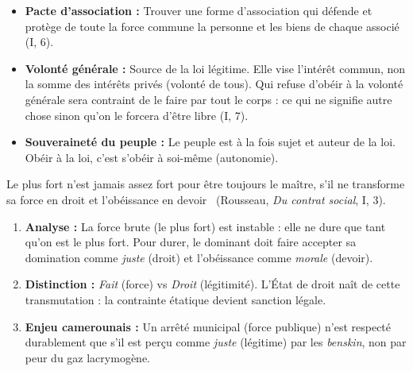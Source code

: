 \documentclass[11pt]{article}
\newcommand{\cle}[1]{{\popxbold\color{popdark}#1}}
\begin{document}
\begin{propriete}
\begin{itemize}
    \item \textbf{Pacte d'association :} \guillemotleft Trouver une forme d'association qui défende et protège de toute la force commune la personne et les biens de chaque associé \guillemotright (I, 6).
    \item \textbf{Volonté générale :} Source de la \cle{loi légitime}. Elle vise l'\cle{intérêt commun}, non la somme des intérêts privés (volonté de tous). \guillemotleft Qui refuse d'obéir à la volonté générale sera contraint de le faire par tout le corps : ce qui ne signifie autre chose sinon qu'on le forcera d'être libre \guillemotright (I, 7).
    \item \textbf{Souveraineté du peuple :} Le peuple est à la fois sujet et auteur de la loi. Obéir à la loi, c'est s'obéir à soi-même (\cle{autonomie}).
\end{itemize}
\end{propriete}

\begin{experience}
\guillemotleft Le plus fort n'est jamais assez fort pour être toujours le maître, s'il ne transforme sa force en droit et l'obéissance en devoir \guillemotright\ (Rousseau, \emph{Du contrat social}, I, 3).
\begin{enumerate}
    \item \textbf{Analyse :} La force brute (le plus fort) est instable : elle ne dure que tant qu'on est le plus fort. Pour durer, le dominant doit faire accepter sa domination comme \emph{juste} (droit) et l'obéissance comme \emph{morale} (devoir).
    \item \textbf{Distinction :} \emph{Fait} (force) vs \emph{Droit} (légitimité). L'État de droit naît de cette transmutation : la contrainte étatique devient sanction légale.
    \item \textbf{Enjeu camerounais :} Un arrêté municipal (force publique) n'est respecté durablement que s'il est perçu comme \emph{juste} (légitime) par les \emph{benskin}, non par peur du gaz lacrymogène.
\end{enumerate}
\end{experience}
\end{document}
